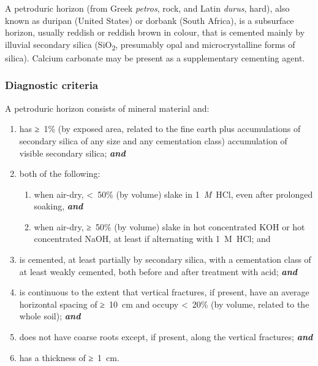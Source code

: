 \documentclass[
  letterpaper,
  DIV=11,
  numbers=noendperiod]{scrreprt}
\providecommand{\tightlist}{%
  \setlength{\itemsep}{0pt}\setlength{\parskip}{0pt}}\usepackage{longtable,booktabs,array}
\begin{document}
A petroduric horizon (from Greek \emph{petros}, rock, and Latin
\emph{durus}, hard), also known as duripan (United States) or dorbank
(South Africa), is a subsurface horizon, usually reddish or reddish
brown in colour, that is cemented mainly by illuvial secondary silica
(SiO\textsubscript{2}, presumably opal and microcrystalline forms of
silica). Calcium carbonate may be present as a supplementary cementing
agent.

\hypertarget{diagnostic-criteria-24}{%
\subsubsection{Diagnostic criteria}\label{diagnostic-criteria-24}}

A petroduric horizon consists of mineral material and:

\begin{enumerate}
\def\labelenumi{\arabic{enumi}.}
\item
  has ≥~1\% (by exposed area, related to the fine earth plus
  accumulations of secondary silica of any size and any cementation
  class) accumulation of visible secondary silica; \textbf{\emph{and}}
\item
  both of the following:

  \begin{enumerate}
  \def\labelenumii{\alph{enumii}.}
  \tightlist
  \item
    when air-dry, \textless~50\% (by volume) slake in 1~\emph{M}~HCl,
    even after prolonged soaking, \textbf{\emph{and}}
  \item
    when air-dry, ≥~50\% (by volume) slake in hot concentrated KOH or
    hot concentrated NaOH, at least if alternating with 1~M~HCl; and
  \end{enumerate}
\item
  is cemented, at least partially by secondary silica, with a
  cementation class of at least weakly cemented, both before and after
  treatment with acid; \textbf{\emph{and}}
\item
  is continuous to the extent that vertical fractures, if present, have
  an average horizontal spacing of ≥~10~cm and occupy \textless~20\% (by
  volume, related to the whole soil); \textbf{\emph{and}}
\item
  does not have coarse roots except, if present, along the vertical
  fractures; \textbf{\emph{and}}
\item
  has a thickness of ≥~1~cm.
\end{enumerate}
\end{document}
